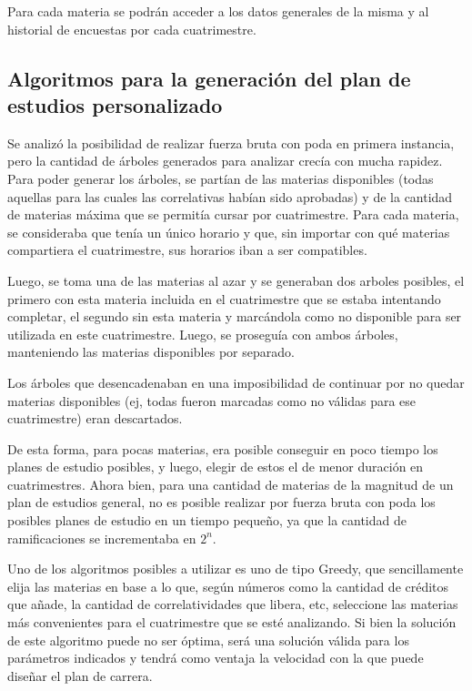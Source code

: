 \documentclass[a4paper]{article}
\begin{document}
Para cada materia se podrán acceder a los datos generales de la misma y al historial de encuestas por cada cuatrimestre.

\subsection{Algoritmos para la generación del plan de estudios personalizado}

	Se analizó la posibilidad de realizar fuerza bruta con poda en primera instancia, pero la cantidad de árboles generados para analizar crecía con mucha rapidez.
Para poder generar los árboles, se partían de las materias disponibles (todas aquellas para las cuales las correlativas habían sido aprobadas) y de la cantidad de materias máxima que se permitía cursar por cuatrimestre. Para cada materia, se consideraba que tenía un único horario y que, sin importar con qué materias compartiera el cuatrimestre, sus horarios iban a ser compatibles.

Luego, se toma una de las materias al azar y se generaban dos arboles posibles, el primero con esta materia incluida en el cuatrimestre que se estaba intentando completar, el segundo sin esta materia y marcándola como no disponible para ser utilizada en este cuatrimestre. Luego, se proseguía con ambos árboles, manteniendo las materias disponibles por separado.

Los árboles que desencadenaban en una imposibilidad de continuar por no quedar materias disponibles (ej, todas fueron marcadas como no válidas para ese cuatrimestre) eran descartados.

De esta forma, para pocas materias, era posible conseguir en poco tiempo los planes de estudio posibles, y luego, elegir de estos el de menor duración en cuatrimestres. Ahora bien, para una cantidad de materias de la magnitud de un plan de estudios general, no es posible realizar por fuerza bruta con poda los posibles planes de estudio en un tiempo pequeño, ya que la cantidad de ramificaciones se incrementaba en $2^{n}$.\newline


Uno de los algoritmos posibles a utilizar es uno de tipo Greedy, que sencillamente elija las materias en base a lo que, según números como la cantidad de créditos que añade, la cantidad de correlatividades que libera, etc, seleccione las materias más convenientes para el cuatrimestre que se esté analizando. Si bien la solución de este algoritmo puede no ser óptima, será una solución válida para los parámetros indicados y tendrá como ventaja la velocidad con la que puede diseñar el plan de carrera.\newline
\end{document}
